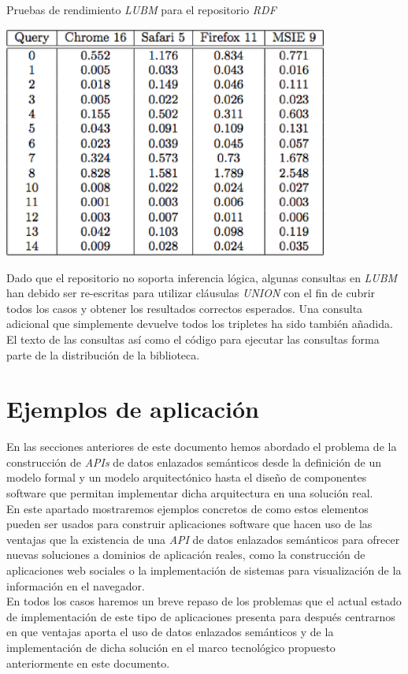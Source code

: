 \begin{table}
\vspace{2.4in}
\caption{Pruebas de rendimiento \textit{LUBM} para el repositorio \textit{RDF}}
\includegraphics[width=0.8\textwidth]{tabla12}
\label{tabla12}
\end{table}

 Dado que el repositorio no soporta inferencia l\'ogica, algunas consultas en \textit{LUBM} han debido ser re-escritas para utilizar cl\'ausulas \textit{UNION} con el fin de cubrir todos los casos y obtener los resultados correctos esperados. Una consulta adicional que simplemente devuelve todos los tripletes ha sido tambi\'en a\~nadida. El texto de las consultas as\'i como el c\'odigo para ejecutar las consultas forma parte de la distribuci\'on de la biblioteca.

\section{Ejemplos de aplicaci\'on}

En las secciones anteriores de este documento hemos abordado el problema de la construcci\'on de \textit{APIs} de datos enlazados sem\'anticos desde la definici\'on de un modelo formal y un modelo arquitect\'onico hasta el dise\~no de componentes software que permitan implementar dicha arquitectura en una soluci\'on real.\\
En este apartado mostraremos ejemplos concretos de como estos elementos pueden ser usados para construir aplicaciones software que hacen uso de las ventajas que la existencia de una \textit{API} de datos enlazados sem\'anticos para ofrecer nuevas soluciones a dominios de aplicaci\'on reales, como la construcci\'on de aplicaciones web sociales o la implementaci\'on de sistemas para visualizaci\'on de la informaci\'on en el navegador.\\
En todos los casos haremos un breve repaso de los problemas que el actual estado de implementaci\'on de este tipo de aplicaciones presenta para despu\'es centrarnos en que ventajas aporta el uso de datos enlazados sem\'anticos y de la implementaci\'on de dicha soluci\'on en el marco tecnol\'ogico propuesto anteriormente en este documento.

